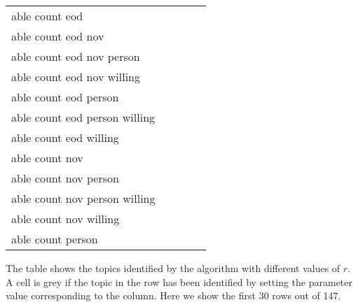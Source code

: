 \begin{table}
\begin{tabular}{>{\raggedright}p{}>{\raggedright}p{}p{}p{}p{}}
                able count eod &        {} &        {} &        {} & \checkC{} \\
                able count eod nov &        {} &        {} &        {} & \checkC{} \\
                able count eod nov person &        {} &        {} &        {} & \checkC{} \\
                able count eod nov willing &        {} &        {} &        {} & \checkC{} \\
                able count eod person &        {} &        {} &        {} & \checkC{} \\
                able count eod person willing &        {} &        {} &        {} & \checkC{} \\
                able count eod willing &        {} &        {} &        {} & \checkC{} \\
                able count nov &        {} &        {} &        {} & \checkC{} \\
                able count nov person &        {} &        {} &        {} & \checkC{} \\
                able count nov person willing &        {} &        {} &        {} & \checkC{} \\
                able count nov willing &        {} &        {} &        {} & \checkC{} \\
                able count person &        {} &        {} &        {} & \checkC{} \\
                
    \bottomrule
    \end{tabular}
    
        \begin{flushleft}
        The table shows the topics identified by the algorithm with different values 
        of $r$. A cell is grey if the topic in the row has been identified by setting the parameter
        value corresponding to the column. Here we show the first 30 rows out of 147. 
    \end{flushleft}
        
\end{table}

